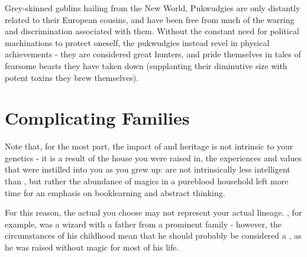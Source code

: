 	{
		Grey-skinned goblins hailing from the New World, Pukwudgies are only distantly related to their European cousins, and have been free from much of the warring and discrimination associated with them. Without the constant need for political machinations to protect oneself, the pukwudgies instead revel in physical achievements - they are considered great hunters, and pride themselves in tales of fearsome beasts they have taken down (supplanting their diminutive size with potent toxins they brew themselves). 
	}
	{
	}
 


\section{Complicating Families}

Note that, for the most part, the impact of  and heritage is not intrinsic to your genetics - it is a result of the house you were raised in, the experiences and values that were instilled into you as you grew up:  are not intrinsically less intelligent than , but rather the abundance of magics in a pureblood household left more time for an emphasis on booklearning and abstract thinking. 

For this reason, the actual  you choose may not represent your actual lineage. , for example, was a  wizard with a father from a prominent  family - however, the circumstances of his childhood mean that he should probably be considered a , as he was raised without magic for most of his life.  
 
